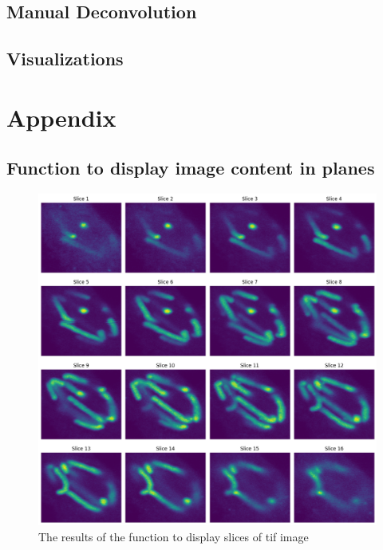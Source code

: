 \documentclass{article}
\begin{document}
\subsection*{Manual Deconvolution}
\subsection*{Visualizations}
\clearpage
\section*{Appendix}
\subsection*{Function to display image content in planes}
\begin{figure}[h!]
    \centering
    \includegraphics[width=1\linewidth]{Report/Images/3d_plot.png}
    \caption{The results of the function to display slices of tif image}
    \label{fig:3d-plane-image}
\end{figure}
% 
% 
\end{document}
